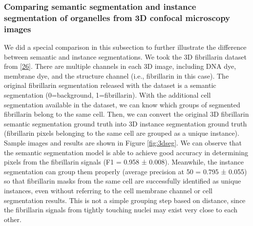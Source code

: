 \hypertarget{comparing-semantic-segmentation-and-instance-segmentation-of-organelles-from-3d-confocal-microscopy-images}{%
\subsubsection{Comparing semantic segmentation and instance segmentation of organelles from 3D confocal microscopy images}\label{comparing-semantic-segmentation-and-instance-segmentation-of-organelles-from-3d-confocal-microscopy-images}}

We did a special comparison in this subsection to further illustrate the difference between semantic and instance segmentations. We took the 3D fibrillarin dataset from {[}\protect\hyperlink{ref-5sGcmDuy}{26}{]}. There are multiple channels in each 3D image, including DNA dye, membrane dye, and the structure channel (i.e., fibrillarin in this case). The original fibrillarin segmentation released with the dataset is a semantic segmentation (0=background, 1=fibrillarin). With the additional cell segmentation available in the dataset, we can know which groups of segmented fibrillarin belong to the same cell. Then, we can convert the original 3D fibrillarin semantic segmentation ground truth into 3D instance segmentation ground truth (fibrillarin pixels belonging to the same cell are grouped as a unique instance). Sample images and results are shown in Figure \ref{fig:3dseg}. We can observe that the semantic segmentation model is able to achieve good accuracy in determining pixels from the fibrillarin signals (F1 = 0.958 ± 0.008). Meanwhile, the instance segmentation can group them properly (average precision at 50 = 0.795 ± 0.055) so that fibrillarin masks from the same cell are successfully identified as unique instances, even without referring to the cell membrane channel or cell segmentation results. This is not a simple grouping step based on distance, since the fibrillarin signals from tightly touching nuclei may exist very close to each other.

